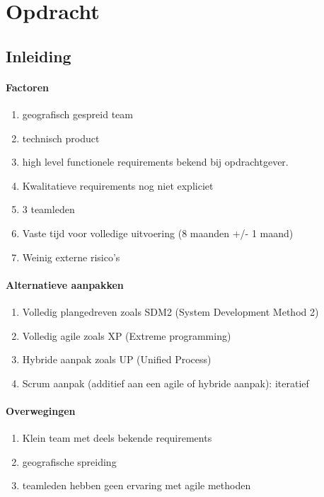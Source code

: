 
\section{Opdracht}

\subsection{Inleiding}

\paragraph{Factoren}

\begin{enumerate}
\item geografisch gespreid team
\item technisch product
\item high level functionele requirements bekend bij opdrachtgever.
\item Kwalitatieve requirements nog niet expliciet
\item 3 teamleden
\item Vaste tijd voor volledige uitvoering (8 maanden +/- 1 maand)
\item Weinig externe risico's
\end{enumerate}

\paragraph{Alternatieve aanpakken}

\begin{enumerate}
\item Volledig plangedreven zoals SDM2 (System Development Method 2)
\item Volledig agile zoals XP (Extreme programming)
\item Hybride aanpak zoals UP (Unified Process)
\item Scrum aanpak (additief aan een agile of hybride aanpak): iteratief
\end{enumerate}

\paragraph{Overwegingen}

\begin{enumerate}
\item Klein team met deels bekende requirements
\item geografische spreiding
\item teamleden hebben geen ervaring met agile methoden
\end{enumerate}

